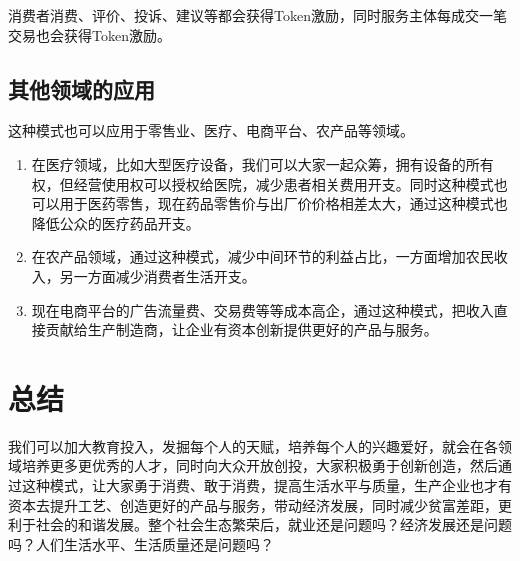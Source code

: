 \documentclass[UTF9]{ctexart}
\begin{document}
消费者消费、评价、投诉、建议等都会获得Token激励，同时服务主体每成交一笔交易也会获得Token激励。

\subsection{其他领域的应用}

这种模式也可以应用于零售业、医疗、电商平台、农产品等领域。

\begin{enumerate}
\item 在医疗领域，比如大型医疗设备，我们可以大家一起众筹，拥有设备的所有权，但经营使用权可以授权给医院，减少患者相关费用开支。同时这种模式也可以用于医药零售，现在药品零售价与出厂价价格相差太大，通过这种模式也降低公众的医疗药品开支。

\item 在农产品领域，通过这种模式，减少中间环节的利益占比，一方面增加农民收入，另一方面减少消费者生活开支。

\item 现在电商平台的广告流量费、交易费等等成本高企，通过这种模式，把收入直接贡献给生产制造商，让企业有资本创新提供更好的产品与服务。

\end{enumerate}

\section{总结}

我们可以加大教育投入，发掘每个人的天赋，培养每个人的兴趣爱好，就会在各领域培养更多更优秀的人才，同时向大众开放创投，大家积极勇于创新创造，然后通过这种模式，让大家勇于消费、敢于消费，提高生活水平与质量，生产企业也才有资本去提升工艺、创造更好的产品与服务，带动经济发展，同时减少贫富差距，更利于社会的和谐发展。整个社会生态繁荣后，就业还是问题吗？经济发展还是问题吗？人们生活水平、生活质量还是问题吗？
\end{document}

